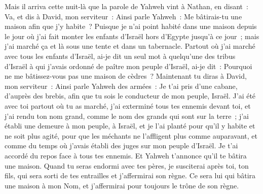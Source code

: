 \begin{multicols}{2}
Mais il arriva cette nuit-là que la parole de Yahweh vint à Nathan, en disant~:
Va, et dis à David, mon serviteur~: Ainsi parle Yahweh~: Me bâtirais-tu une maison afin que j'y habite~?
Puisque je n'ai point habité dans une maison depuis le jour où j'ai fait monter les enfants d'Israël hors d'Egypte jusqu'à ce jour~; mais j'ai marché ça et là sous une tente et dans un tabernacle.
Partout où j'ai marché avec tous les enfants d'Israël, ai-je dit un seul mot à quelqu'une des tribus d'Israël à qui j'avais ordonné de paître mon peuple d'Israël, ai-je dit~: Pourquoi ne me bâtissez-vous pas une maison de cèdres~?
Maintenant tu diras à David, mon serviteur~: Ainsi parle Yahweh des armées~: Je t'ai pris d'une cabane, d'auprès des brebis, afin que tu sois le conducteur de mon peuple, Israël.
J'ai été avec toi partout où tu as marché, j'ai exterminé tous tes ennemis devant toi, et j'ai rendu ton nom grand, comme le nom des grands qui sont sur la terre~;
j'ai établi une demeure à mon peuple, à Israël, et je l'ai planté pour qu'il y habite et ne soit plus agité, pour que les méchants ne l'affligent plus comme auparavant,
et comme du temps où j'avais établi des juges sur mon peuple d'Israël. Je t'ai accordé du repos face à tous tes ennemis. Et Yahweh t'annonce qu'il te bâtira une maison.
Quand tu seras endormi avec tes pères, je susciterai après toi, ton fils, qui sera sorti de tes entrailles et j'affermirai son règne.
Ce sera lui qui bâtira une maison à mon Nom, et j'affermirai pour toujours le trône de son règne.

\end{multicols}
